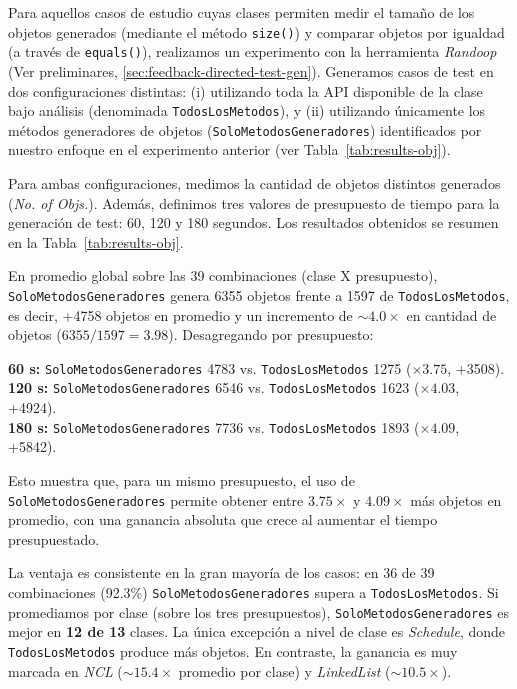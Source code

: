 Para aquellos casos de estudio cuyas clases permiten medir el tamaño de los objetos generados 
(mediante el método \texttt{size()}) y comparar objetos por igualdad (a través de \texttt{equals()}), 
realizamos un experimento con la herramienta \emph{Randoop} (Ver preliminares, \ref{sec:feedback-directed-test-gen}). Generamos casos de test en dos 
configuraciones distintas: (i) utilizando toda la API disponible de la clase bajo análisis 
(denominada \texttt{TodosLosMetodos}), y (ii) utilizando únicamente los métodos generadores de objetos
(\texttt{SoloMetodosGeneradores}) identificados por nuestro enfoque en el experimento anterior 
(ver Tabla~\ref{tab:results-obj}).

Para ambas configuraciones, medimos la cantidad de objetos distintos 
generados (\emph{No. of Objs.}). Además, definimos tres valores de presupuesto de tiempo para la generación de 
test: 60, 120 y 180 segundos. Los resultados obtenidos se resumen en la
Tabla~\ref{tab:results-obj}.

En promedio global sobre las 39 combinaciones (clase X presupuesto),
\texttt{SoloMetodosGeneradores} genera 6355 objetos frente a 1597 de
\texttt{TodosLosMetodos}, es decir, +4758 objetos en promedio y un
incremento de \textbf{\(\sim 4.0\times\)} en cantidad de objetos (\(6355/1597=3.98\)). Desagregando por presupuesto:

\noindent\textbf{60 s:} \texttt{SoloMetodosGeneradores} 4783 vs. \texttt{TodosLosMetodos} 1275
(\(\times 3.75\), +3508).\\
\textbf{120 s:} \texttt{SoloMetodosGeneradores} 6546 vs. \texttt{TodosLosMetodos} 1623
(\(\times 4.03\), +4924).\\
\textbf{180 s:} \texttt{SoloMetodosGeneradores} 7736 vs. \texttt{TodosLosMetodos} 1893
(\(\times 4.09\), +5842).

Esto muestra que, para un mismo presupuesto, el uso de \texttt{SoloMetodosGeneradores}
permite obtener entre \(3.75\times\) y \(4.09\times\) más objetos en
promedio, con una ganancia absoluta que crece al aumentar el tiempo
presupuestado.

La ventaja es consistente en la gran mayoría de los casos: en 36 de 39
combinaciones (92.3\%) \texttt{SoloMetodosGeneradores} supera a \texttt{TodosLosMetodos}. Si
promediamos por clase (sobre los tres presupuestos), \texttt{SoloMetodosGeneradores} es mejor
en \textbf{12 de 13} clases. La única excepción a nivel de clase es
\emph{Schedule}, donde \texttt{TodosLosMetodos} produce más objetos. En contraste, la ganancia es muy marcada en
\emph{NCL} (\(\sim 15.4\times\) promedio por clase) y \emph{LinkedList}
(\(\sim 10.5\times\)).

